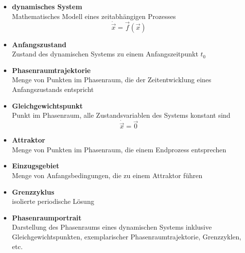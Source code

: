 \documentclass{article}
\begin{document}
	\begin{itemize}
		\item \textbf{dynamisches System}\\
		Mathematisches Modell eines zeitabhängigen Prozesses
			\begin{equation}
				\dot{\vec{x}} = \vec{f}(\vec{x})
			\end{equation}
		
		
		
		
		\item \textbf{Anfangszustand}\\
		Zustand des dynamischen Systems zu einem Anfangszeitpunkt $t_0$
		
		
		\item \textbf{Phasenraumtrajektorie}\\
		Menge von Punkten im Phasenraum, die der Zeitentwicklung eines Anfangszustands entspricht
		

		\item \textbf{Gleichgewichtspunkt}\\
		Punkt im Phasenraum, alle Zustandsvariablen des Systems konstant sind
			\begin{equation}
				\dot{\vec{x}} = \vec{0}
			\end{equation}
		
				
		\item \textbf{Attraktor}\\
		Menge von Punkten im Phasenraum, die einem Endprozess entsprechen
		
		
		
		\item \textbf{Einzugsgebiet}\\
		Menge von Anfangsbedingungen, die zu einem Attraktor führen
		
		
		\item \textbf{Grenzzyklus}\\
		isolierte periodische Lösung
		
		
		\item \textbf{Phasenraumportrait}\\
		Darstellung des Phasenraums eines dynamischen Systems inklusive Gleichgewichtspunkten, exemplarischer Phasenraumtrajektorie, Grenzzyklen, etc.
	\end{itemize}


\newpage
\end{document}
